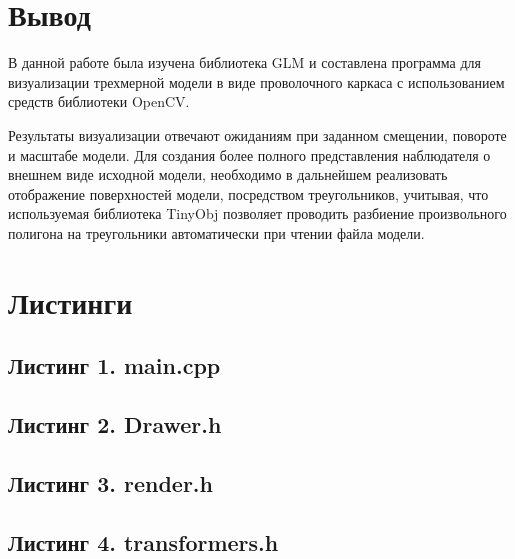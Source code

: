 \documentclass[14pt,a4paper,report]{report}
\begin{document}
\clearpage
\section{Вывод}
В данной работе была изучена библиотека GLM и составлена программа для визуализации трехмерной модели в виде проволочного каркаса с использованием средств библиотеки OpenCV.

Результаты визуализации отвечают ожиданиям при заданном смещении, повороте и масштабе модели. Для создания более полного представления наблюдателя о внешнем виде исходной модели, необходимо в дальнейшем реализовать отображение поверхностей модели, посредством треугольников, учитывая, что используемая библиотека TinyObj позволяет проводить разбиение произвольного полигона на треугольники автоматически при чтении файла модели.

\clearpage
\section{Листинги}
\subsection{Листинг 1. main.cpp}

\clearpage
\subsection{Листинг 2. Drawer.h}

\clearpage
\subsection{Листинг 3. render.h}

\clearpage
\subsection{Листинг 4. transformers.h}

\clearpage
\end{document}
